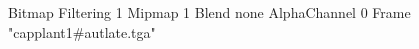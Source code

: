 {Bitmap
	{Filtering 1}
	{Mipmap 1}
	{Blend none}
	{AlphaChannel 0}
	{Frame "capplant1#autlate.tga"}
}
